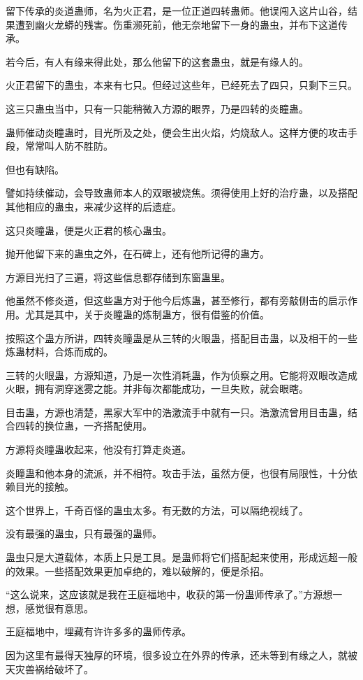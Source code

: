\begin{this_body}
留下传承的炎道蛊师，名为火正君，是一位正道四转蛊师。他误闯入这片山谷，结果遭到幽火龙蟒的残害。伤重濒死前，他无奈地留下一身的蛊虫，并布下这道传承。

若今后，有人有缘来得此处，那么他留下的这套蛊虫，就是有缘人的。

火正君留下的蛊虫，本来有七只。但经过这些年，已经死去了四只，只剩下三只。

这三只蛊虫当中，只有一只能稍微入方源的眼界，乃是四转的炎瞳蛊。

蛊师催动炎瞳蛊时，目光所及之处，便会生出火焰，灼烧敌人。这样方便的攻击手段，常常叫人防不胜防。

但也有缺陷。

譬如持续催动，会导致蛊师本人的双眼被烧焦。须得使用上好的治疗蛊，以及搭配其他相应的蛊虫，来减少这样的后遗症。

这只炎瞳蛊，便是火正君的核心蛊虫。

抛开他留下来的蛊虫之外，在石碑上，还有他所记得的蛊方。

方源目光扫了三遍，将这些信息都存储到东窗蛊里。

他虽然不修炎道，但这些蛊方对于他今后炼蛊，甚至修行，都有旁敲侧击的启示作用。尤其是其中，关于炎瞳蛊的炼制蛊方，很有借鉴的价值。

按照这个蛊方所讲，四转炎瞳蛊是从三转的火眼蛊，搭配目击蛊，以及相干的一些炼蛊材料，合炼而成的。

三转的火眼蛊，方源知道，乃是一次性消耗蛊，作为侦察之用。它能将双眼改造成火眼，拥有洞穿迷雾之能。并非每次都能成功，一旦失败，就会眼瞎。

目击蛊，方源也清楚，黑家大军中的浩激流手中就有一只。浩激流曾用目击蛊，结合四转的换位蛊，一齐搭配使用。

方源将炎瞳蛊收起来，他没有打算走炎道。

炎瞳蛊和他本身的流派，并不相符。攻击手法，虽然方便，也很有局限性，十分依赖目光的接触。

这个世界上，千奇百怪的蛊虫太多。有无数的方法，可以隔绝视线了。

没有最强的蛊虫，只有最强的蛊师。

蛊虫只是大道载体，本质上只是工具。是蛊师将它们搭配起来使用，形成远超一般的效果。一些搭配效果更加卓绝的，难以破解的，便是杀招。

“这么说来，这应该就是我在王庭福地中，收获的第一份蛊师传承了。”方源想一想，感觉很有意思。

王庭福地中，埋藏有许许多多的蛊师传承。

因为这里有最得天独厚的环境，很多设立在外界的传承，还未等到有缘之人，就被天灾兽祸给破坏了。


\end{this_body}
